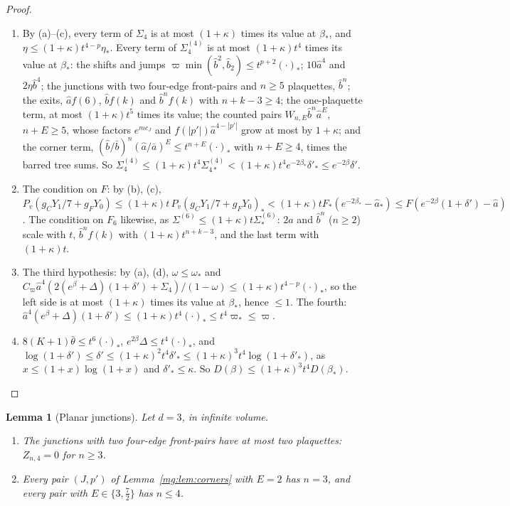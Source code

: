 \documentclass[11pt,a4paper]{article}
\newtheorem{lemma}[theorem]{Lemma}
\theoremstyle{definition}
\theoremstyle{remark}
\begin{document}
\begin{proof}
\begin{enumerate}[label=(\alph*)]
\item By (a)--(c), every term of $\Sigma_4$ is at most $(1+\kappa)$ times its value at $\beta_*$, and $\eta\le(1+\kappa)t^{4-p}\eta_*$. Every term of $\Sigma^{(4)}_4$ is at most $(1+\kappa)t^4$ times its
value at $\beta_*$: the shifts and jumps $\varpi\min(\hat b^2,\hat b_2)\le t^{p+2}(\cdot)_*$; $10\hat a^4$ and $2\eta\hat b^4$; the junctions with two four-edge front-pairs and $n\ge5$ plaquettes,
$\hat b^n$; the exits, $\hat af(6)$, $\hat bf(k)$ and $\hat b^nf(k)$ with $n+k-3\ge4$; the one-plaquette term, at most $(1+\kappa)t^5$ times its value; the counted pairs $W_{n,E}\hat b^n\hat a^E$,
$n+E\ge5$, whose factors $e^{mc_J}$ and $f(|p'|)\hat a^{4-|p'|}$ grow at most by $1+\kappa$; and the corner term, $(\hat b/\bar b)^n(\hat a/\bar a)^E\le t^{n+E}(\cdot)_*$ with $n+E\ge4$, times the barred tree
sums. So
$\Sigma^{(4)}_4\le(1+\kappa)t^4\Sigma^{(4)}_{4*}<(1+\kappa)t^4e^{-2\beta_*}\delta'_*\le e^{-2\beta}\delta'$.
\item The condition on $F$: by (b), (c), $P_v(g_CY_1/7+g_FY_0)\le(1+\kappa)t\,P_v(g_CY_1/7+g_FY_0)_*<(1+\kappa)tF_*(e^{-2\beta_*}-\hat a_*)\le F(e^{-2\beta}(1+\delta')-\hat a)$. The condition on
$F_6$ likewise, as $\Sigma^{(6)}\le(1+\kappa)t\Sigma^{(6)}_*$: $2\hat a$ and $\hat b^n$ ($n\ge2$) scale with $t$, $\hat b^nf(k)$ with $(1+\kappa)t^{n+k-3}$, and the last term with $(1+\kappa)t$.
\item The third hypothesis: by (a), (d), $\omega\le\omega_*$ and $C_\varpi\hat a^4(2(e^\beta+\Delta)(1+\delta')+\Sigma_4)/(1-\omega)\le(1+\kappa)t^{4-p}(\cdot)_*$, so the left side is at most $(1+\kappa)$
times its value at $\beta_*$, hence $\le1$. The fourth: $\hat a^4(e^\beta+\Delta)(1+\delta')\le(1+\kappa)t^4(\cdot)_*\le t^4\varpi_*\le\varpi$.
\item $8(K+1)\bar\theta\le t^6(\cdot)_*$, $e^{2\beta}\Delta\le t^4(\cdot)_*$, and $\log(1+\delta')\le\delta'\le(1+\kappa)^2t^4\delta'_*\le(1+\kappa)^3t^4\log(1+\delta'_*)$, as $x\le(1+x)\log(1+x)$ and
$\delta'_*\le\kappa$. So $D(\beta)\le(1+\kappa)^3t^4D(\beta_*)$.\qedhere
\end{enumerate}
\end{proof}

\begin{lemma}[Planar junctions]\label{mg:lem:planar}
Let $d=3$, in infinite volume.
\begin{enumerate}[label=(\roman*)]
\item The junctions with two four-edge front-pairs have at most two plaquettes: $Z_{n,4}=0$ for $n\ge3$.
\item Every pair $(J,p')$ of Lemma~\ref{mg:lem:corners} with $E=2$ has $n=3$, and every pair with $E\in\{3,\frac72\}$ has $n\le4$.
\end{enumerate}
\end{lemma}
\end{document}
